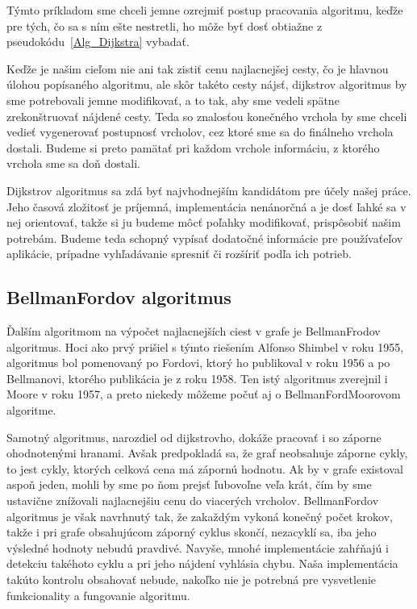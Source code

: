 Týmto príkladom sme chceli jemne ozrejmiť postup pracovania algoritmu, keďže pre tých, čo sa s ním ešte nestretli, ho môže byť dosť obtiažne z pseudokódu~\ref{Alg_Dijkstra} vybadať.\newline

Keďže je našim cieľom nie ani tak zistiť cenu najlacnejšej cesty, čo je hlavnou úlohou popísaného algoritmu, ale skôr takéto cesty nájsť, dijkstrov algoritmus by sme potrebovali jemne modifikovať, a to tak, aby sme vedeli spätne zrekonštruovať nájdené cesty. Teda so znalosťou konečného vrchola by sme chceli vedieť vygenerovať postupnosť vrcholov, cez ktoré sme sa do finálneho vrchola dostali. Budeme si preto pamätať pri každom vrchole informáciu, z ktorého vrchola sme sa doň dostali.\newline

Dijkstrov algoritmus sa zdá byť najvhodnejším kandidátom pre účely našej práce. Jeho časová zložitosť je príjemná, implementácia nenánorčná a je dosť ľahké sa v nej orientovať, takže si ju budeme môcť poľahky modifikovať, prispôsobiť našim potrebám. Budeme teda schopný vypísať dodatočné informácie pre používaťeľov aplikácie, prípadne vyhľadávanie spresniť či rozšíriť podľa ich potrieb.\newline


\subsection{Bellman\textendash Fordov algoritmus}

Ďalším algoritmom na výpočet najlacnejších ciest v grafe je Bellman\textendash Frodov algoritmus. Hoci ako prvý prišiel s týmto riešením Alfonso Shimbel v roku 1955, algoritmus bol pomenovaný po Fordovi, ktorý ho publikoval v roku 1956 a po Bellmanovi, ktorého publikácia je z roku 1958. Ten istý algoritmus zverejnil i Moore v roku 1957, a preto niekedy môžeme počuť aj o Bellman\textendash Ford\textendash Moorovom algoritme.\newline

Samotný algoritmus, narozdiel od dijkstrovho, dokáže pracovať i so záporne ohodnotenými hranami. Avšak predpokladá sa, že graf neobsahuje záporne cykly, to jest cykly, ktorých celková cena má zápornú hodnotu. Ak by v grafe existoval aspoň jeden, mohli by sme po ňom prejsť ľubovoľne veľa krát, čím by sme ustavične znížovali najlacnejšiu cenu do viacerých vrcholov. Bellman\textendash Fordov algoritmus je však navrhnutý tak, že zakaždým vykoná konečný počet krokov, takže i pri grafe obsahujúcom záporný cyklus skončí, nezacyklí sa, iba jeho výsledné hodnoty nebudú pravdivé. Navyše, mnohé implementácie zahŕňajú i detekciu takéhoto cyklu a pri jeho nájdení vyhlásia chybu. Naša implementácia takúto kontrolu obsahovať nebude, nakoľko nie je potrebná pre vysvetlenie funkcionality a fungovanie algoritmu.\newline

